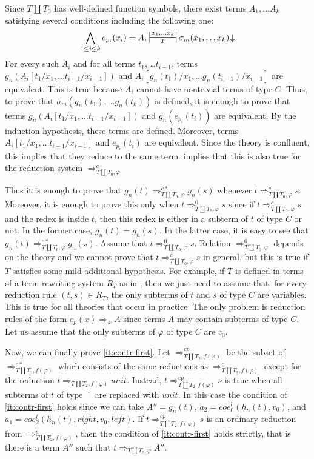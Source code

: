 \documentclass[reqno]{amsart}
\theoremstyle{definition}
\theoremstyle{remark}
\newcommand{\unit}{\mathit{unit}}
\newcommand{\leftI}{\mathit{left}}
\newcommand{\rightI}{\mathit{right}}
\newcommand{\coe}{\mathit{coe}}
\numberwithin{figure}{section}
\begin{document}
Since $T \amalg T_0$ has well-defined function symbols, there exist terms $A_1, \ldots A_k$ satisfying several conditions including the following one:
\[ \bigwedge_{1 \leq i \leq k} e_{p_i}(x_i) = A_i \ssststile{T}{x_1, \ldots x_k} \sigma_m(x_1, \ldots x_k)\!\downarrow \]
For every such $A_i$ and for all terms $t_1$, \ldots $t_{i-1}$, terms $g_n(A_i[t_1/x_1, \ldots t_{i-1}/x_{i-1}])$ and $A_i[g_n(t_1)/x_1, \ldots g_n(t_{i-1})/x_{i-1}]$ are equivalent.
This is true because $A_i$ cannot have nontrivial terms of type $C$.
Thus, to prove that $\sigma_m(g_n(t_1), \ldots g_n(t_k))$ is defined, it is enough to prove that terms $g_n(A_i[t_1/x_1, \ldots t_{i-1}/x_{i-1}])$ and $g_n(e_{p_i}(t_i))$ are equivalent.
By the induction hypothesis, these terms are defined.
Moreover, terms $A_i[t_1/x_1, \ldots t_{i-1}/x_{i-1}]$ and $e_{p_i}(t_i)$ are equivalent.
Since the theory is confluent, this implies that they reduce to the same term.
 implies that this is also true for the reduction system $\Rightarrow_{T \amalg T_0, \varphi}^c$

Thus it is enough to prove that $g_n(t) \Rightarrow_{T \amalg T_0, \varphi}^{c*} g_n(s)$ whenever $t \Rightarrow_{T \amalg T_0, \varphi}^c s$.
Moreover, it is enough to prove this only when $t \Rightarrow_{T \amalg T_0, \varphi}^0 s$ since if $t \Rightarrow_{T \amalg T_0, \varphi}^c s$ and the redex is inside $t$,
then this redex is either in a subterm of $t$ of type $C$ or not.
In the former case, $g_n(t) = g_n(s)$.
In the latter case, it is easy to see that $g_n(t) \Rightarrow_{T \amalg T_0, \varphi}^{c*} g_n(s)$.
Assume that $t \Rightarrow_{T \amalg T_0, \varphi}^0 s$.
Relation $\Rightarrow_{T \amalg T_0, \varphi}^0$ depends on the theory and we cannot prove that $t \Rightarrow_{T \amalg T_0, \varphi}^c s$ in general,
but this is true if $T$ satisfies some mild additional hypothesis.
For example, if $T$ is defined in terms of a term rewriting system $R_T$ as in , then we just need to assume that, for every reduction rule $(t,s) \in R_T$,
the only subterms of $t$ and $s$ of type $C$ are variables.
This is true for all theories that occur in practice.
The only problem is reduction rules of the form $e_p(x) \Rightarrow_\varphi A$ since terms $A$ may contain subterms of type $C$.
Let us assume that the only subterms of $\varphi$ of type $C$ are $c_0$.

Now, we can finally prove \eqref{it:contr-first}.
Let $\Rightarrow_{T \amalg T_2, f(\varphi)}^{cp}$ be the subset of $\Rightarrow_{T \amalg T_2, f(\varphi)}^{c*}$ which consists of the same reductions as $\Rightarrow_{T \amalg T_2, f(\varphi)}^c$
except for the reduction $t \Rightarrow_{T \amalg T_2, f(\varphi)} \unit$.
Instead, $t \Rightarrow_{T \amalg T_2, f(\varphi)}^{cp} s$ is true when all subterms of $t$ of type $\top$ are replaced with $\unit$.
In this case the condition of \eqref{it:contr-first} holds since we can take $A'' = g_n(t)$, $a_2 = \coe^l_0(h_n(t), v_0)$, and $a_1 = \coe^l_2(h_n(t), \rightI, v_0, \leftI)$.
If $t \Rightarrow_{T \amalg T_2, f(\varphi)}^{cp} s$ is an ordinary reduction from $\Rightarrow_{T \amalg T_2, f(\varphi)}^c$, then the condition of \eqref{it:contr-first} holds strictly,
that is there is a term $A''$ such that $t \Rightarrow_{T \amalg T_0, \varphi} A''$.
\end{document}
